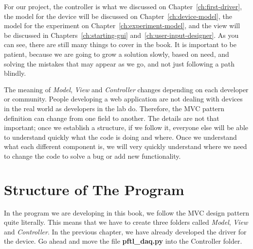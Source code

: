 For our project, the controller is what we discussed on Chapter~\ref{ch:first-driver}, the model for the device will be discussed on Chapter~\ref{ch:device-model}, the model for the experiment on Chapter~\ref{ch:experiment-model}, and the view will be discussed in Chapters~\ref{ch:starting-gui} and~\ref{ch:user-input-designer}. As you can see, there are still many things to cover in the book. It is important to be patient, because we are going to grow a solution slowly, based on need, and solving the mistakes that may appear as we go, and not just following a path blindly.


The meaning of \emph{Model}, \emph{View} and \emph{Controller} changes depending on each developer or community. People developing a web application are not dealing with devices in the real world as developers in the lab do. Therefore, the {MVC} pattern definition can change from one field to another. The details are not that important; once we establish a structure, if we follow it, everyone else will be able to understand quickly what the code is doing and where. Once we understand what each different component is, we will very quickly understand where we need to change the code to solve a bug or add new functionality.

\section{Structure of The Program}\label{sec:structure-of-theprogram}
In the program we are developing in this book, we follow the MVC design pattern quite literally. This means that we have to create three folders called \emph{Model}, \emph{View} and \emph{Controller}. In the previous chapter, we have already developed the driver for the device. Go ahead and move the file \textbf{pftl\_daq.py} into the Controller folder.


